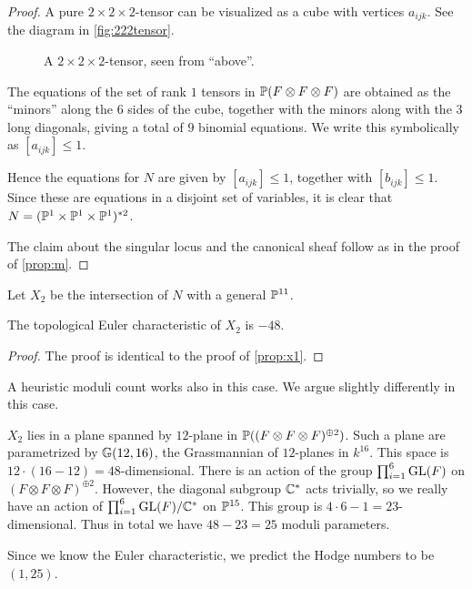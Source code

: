 \begin{proof}
A pure $2 \times 2 \times 2$-tensor can be visualized as a cube with vertices $a_{ijk}$. See the diagram in \vref{fig:222tensor}. 

\begin{figure}[t]
\centering

\caption{A $2 \times 2 \times 2$-tensor, seen from ``above''.}
\label{fig:222tensor}
\end{figure}

The equations of the set of rank $1$ tensors in $\P(F \otimes F \otimes F)$ are obtained as the ``minors'' along the $6$ sides of the cube, together with the minors along with the $3$ long diagonals, giving a total of $9$ binomial equations. We write this symbolically as $[a_{ijk}] \leq 1$. 

Hence the equations for $N$ are given by $[a_{ijk}] \leq 1$, together with $[b_{ijk}] \leq 1$. Since these are equations in a disjoint set of variables, it is clear that $N=(\P^1 \times \P^1 \times \P^1)^{\ast 2}$.

The claim about the singular locus and the canonical sheaf follow as in the proof of \cref{prop:m}.
\end{proof}

Let $X_2$ be the intersection of $N$ with a general $\P^{11}$.

\begin{proposition}
The topological Euler characteristic of $X_2$ is $-48$.
\end{proposition}
\begin{proof}
The proof is identical to the proof of \cref{prop:x1}.
\end{proof}

\begin{remark}
A heuristic moduli count works also in this case. We argue slightly differently in this case.

$X_2$ lies in a plane spanned by $12$-plane in $\P((F \otimes F \otimes F)^{\oplus 2})$. Such a plane are parametrized by $\Gr(12,16)$, the Grassmannian of $12$-planes in $k^{16}$. This space is $12 \cdot (16-12)=48$-dimensional. There is an action of the group $\prod_{i=1}^6 \GL(F)$ on $(F \otimes F \otimes F)^{\oplus 2}$. However, the diagonal subgroup $\C^\ast$ acts trivially, so we really have an action of $\prod_{i=1}^6 \GL(F)/ \C^\ast$ on $\P^{15}$. This group is $4 \cdot 6-1=23$-dimensional. Thus in total we have $48-23=25$ moduli parameters.

Since we know the Euler characteristic, we predict the Hodge numbers to be $(1,25)$.
\end{remark}

